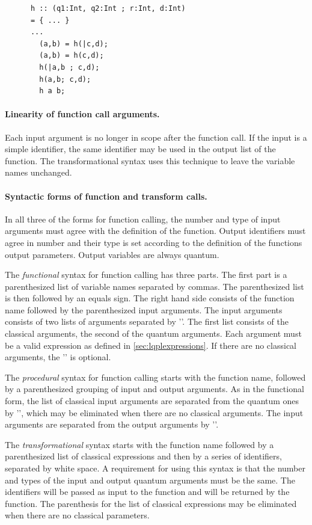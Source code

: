 \begin{lstlisting}
      h :: (q1:Int, q2:Int ; r:Int, d:Int) 
      = { ... }
      ...
        (a,b) = h(|c,d);
        (a,b) = h(c,d);
        h(|a,b ; c,d);
        h(a,b; c,d);
        h a b;
\end{lstlisting}



\paragraph{Linearity of function call arguments.}
Each input argument is no longer in scope after the function call. If 
the input is a simple identifier, the same identifier may be used in
the output list of the function. The transformational
syntax uses this technique to leave the variable names unchanged.

\paragraph{Syntactic forms of function and transform calls.}
In all three of the forms for function calling, the number and type
of input arguments must agree with the definition of the function.
Output identifiers must agree in number and their type is set according
to the definition of the functions output parameters. Output
variables are always quantum.

The  \emph{functional} syntax for function calling has three parts.
The first part is a parenthesized  list of variable names separated by 
commas.
The parenthesized list is then followed by an equals sign. The right hand side
 consists of the function name
followed by the  parenthesized  input arguments. The input arguments 
consists of two lists of arguments separated by '\inlqpl{|}'. The first
list consists of the classical arguments, the second of the quantum arguments.
Each argument must be a valid expression as defined 
in  \vref{sec:lqplexpressions}.
 If there are no classical arguments, the '\inlqpl{|}' is optional.


The  \emph{procedural} syntax for function calling starts with the
function name, followed by a parenthesized grouping of input and
output arguments.  As in the functional form, the list of classical input 
arguments are separated from the quantum ones by '\inlqpl{|}', which may
be eliminated when there are no classical arguments. The input arguments
are separated from the output arguments by '\inlqpl{;}'. 

The \emph{transformational} syntax starts with the
function name followed  by a parenthesized list of classical
expressions and then by a series of identifiers, separated by white space.
A requirement for using this syntax is that the
number and types of the input and output quantum arguments must be the same. 
The identifiers will be passed as input to the function and will be
returned by the function. The parenthesis for the list of classical
expressions may be eliminated when there are no classical parameters.



